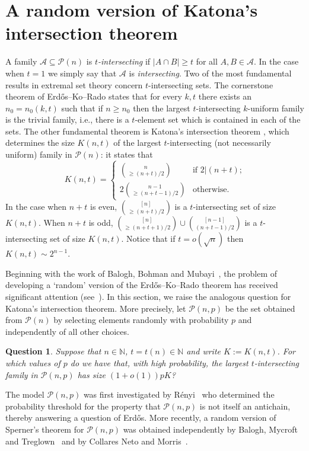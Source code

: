 \documentclass[11pt]{article}
\newtheorem{question}[theorem]{Question}
\numberwithin{equation}{section}
\def\P{\mathcal{P}}
\begin{document}
\section{A random version of Katona's intersection theorem}\label{sec:int}
A family $\mathcal A \subseteq \P(n)$ is \emph{$t$-intersecting} if $|A\cap B|\geq t$ for all $A,B \in \mathcal A$. In the case when $t=1$ we simply say that $\mathcal A$ is \emph{intersecting}.
Two of the most fundamental results in extremal set theory concern $t$-intersecting sets. 
The cornerstone theorem of Erd\H{o}s--Ko--Rado states that for every $k,t$ there exists an $n_0=n_0(k,t)$ such that if $n\geq n_0$ then the largest $t$-intersecting  $k$-uniform family is the trivial family, i.e., there is a $t$-element set which is contained in each of the sets.
The other fundamental theorem is Katona's intersection theorem \cite{katona}, which determines the size $K(n,t)$ of the largest $t$-intersecting (not necessarily uniform) family in $\mathcal{P}(n)$: it states that
$$K(n,t)=\begin{cases}
\binom{n}{\geq (n+t)/2}& \text{if $2|(n+t)$;}\\
2\binom{n-1}{\geq (n+t-1)/2} & \text{otherwise.}
\end{cases}$$
In the case when $n+t$ is even, $\binom{[n]}{\geq (n+t)/2}$ is a $t$-intersecting set of size $K(n,t)$. When $n+t$ is odd, $\binom{[n]}{\geq (n+t+1)/2} \cup  \binom{[n-1]}{(n+t-1)/2}$ is a $t$-intersecting set of size $K(n,t)$.
Notice that if $t=o(\sqrt{n})$ then $K(n,t)\sim 2^{n-1}$.

Beginning with the work of Balogh, Bohman and Mubayi~\cite{bbm}, the problem of
developing a 	`random' version of the Erd\H{o}s--Ko--Rado theorem has received significant attention (see~\cite{bbm, das, gauy, kahn1, kahn2}). In this section, we raise the analogous question for Katona's intersection theorem. More precisely,
let $\P(n, p)$ be the set obtained from $\P(n)$ by selecting elements randomly with probability $p$ and independently of all other choices. 
\begin{question}\label{ques1}
Suppose that $n \in \mathbb N$, $t=t(n)\in \mathbb N$ and write $K:=K(n,t)$. For which values of $p$ do we have that, with high probability, the largest $t$-intersecting family in $\P(n,p)$ has size $(1+o(1))pK$?
\end{question}
The model $\P(n,p)$ was first investigated by R\'enyi~\cite{renyi} who determined the probability threshold for the property that $\P(n,p)$ is not itself an antichain, thereby answering a question of Erd\H{o}s. 
More recently, a random version of Sperner's theorem for $\P(n, p)$ was obtained independently by Balogh, Mycroft and Treglown~\cite{sper} and by Collares Neto and  Morris~\cite{cm}.
\end{document}
